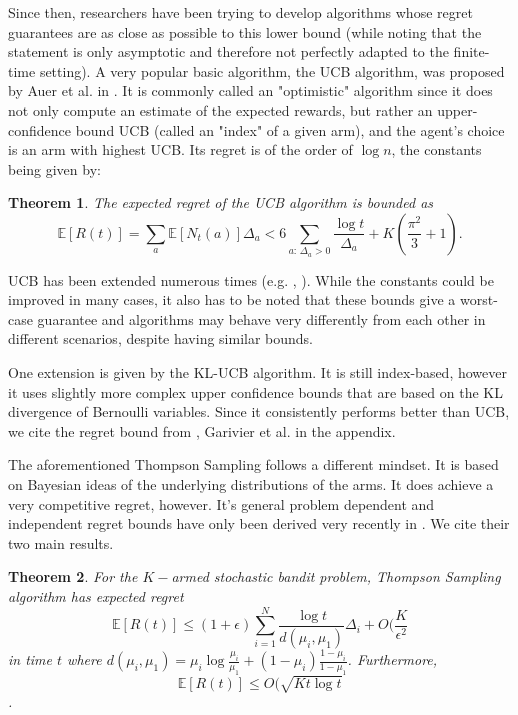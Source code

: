 \documentclass[10.5pt]{article}
\newtheorem{theorem}{Theorem}
\begin{document}
Since then, researchers have been trying to develop algorithms whose regret guarantees are as close as possible to this lower bound (while noting that the statement is only asymptotic and therefore not perfectly adapted to the finite-time setting). A very popular basic algorithm, the UCB algorithm, was proposed by Auer et al. in \cite{Auer02a}. It is commonly called an "optimistic" algorithm since it does not only compute an estimate of the expected rewards, but rather an upper-confidence bound UCB (called an "index" of a given arm), and the agent's choice is an arm with highest UCB. Its regret is of the order of $\log n$, the constants being given by:
\begin{theorem}
The expected regret of the UCB algorithm is bounded as
$$ \mathbb{E}[R(t)] = \sum_{a}\mathbb{E}[N_{t}(a)]\Delta_{a} <
 6 \sum_{a: \, \Delta_a > 0} \frac{\log t}{\Delta_a} + K (\frac{\pi^2}{3} + 1).$$
\end{theorem}

UCB has been extended numerous times (e.g. \cite{Audi09}, \cite{Audi10}). While the constants could be improved in many cases, it also has to be noted that these bounds give a worst-case guarantee and algorithms may behave very differently from each other in different scenarios, despite having similar bounds.

One extension is given by the KL-UCB algorithm. It is still index-based, however it uses slightly more complex upper confidence bounds that are based on the KL divergence of Bernoulli variables. Since it consistently performs better than UCB, we cite the regret bound from \cite{Gari11}, Garivier et al. in the appendix.

The aforementioned Thompson Sampling follows a different mindset. It is based on Bayesian ideas of the underlying distributions of the arms. It does achieve a very competitive regret, however. It's general problem dependent and independent regret bounds have only been derived very recently in \cite{}. We cite their two main results.

\begin{theorem}
For the $K-$armed stochastic bandit problem, Thompson Sampling algorithm has expected regret
$$\mathbb{E}[R(t)] \leq (1 + \epsilon) \sum_{i=1}^N \frac{\log t}{d(\mu_i, \mu_1)}\Delta_i + O(\frac{K}{\epsilon^2} $$
in time $t$ where $d(\mu_i, \mu_1) = \mu_i \log \frac{\mu_i}{\mu_1} + (1 - \mu_i) \frac{1-\mu_i}{1 - \mu_1}$.
Furthermore,
$$ \mathbb{E}[R(t)]  \leq O(\sqrt{K t \log t}$$.
\end{theorem}
\end{document}
